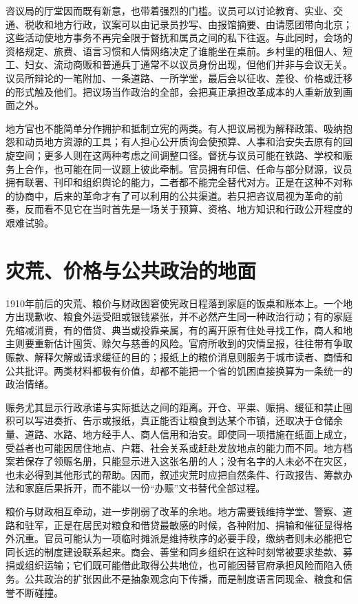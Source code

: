 咨议局的厅堂因而既有新意，也带着强烈的门槛。议员可以讨论教育、实业、交通、税收和地方行政，议案可以由记录员抄写、由报馆摘要、由请愿团带向北京；这些活动使地方事务不再完全限于督抚和属员之间的私下往返。与此同时，会场的资格规定、旅费、语言习惯和人情网络决定了谁能坐在桌前。乡村里的租佃人、短工、妇女、流动商贩和普通兵丁通常不以议员身份出现，但他们并非与会议无关。议员所辩论的一笔附加、一条道路、一所学堂，最后会以征收、差役、价格或迁移的形式触及他们。把议场当作政治的全部，会把真正承担改革成本的人重新放到画面之外。

地方官也不能简单分作拥护和抵制立宪的两类。有人把议局视为解释政策、吸纳抱怨和动员地方资源的工具；有人担心公开质询会使预算、人事和治安失去原有的回旋空间；更多人则在这两种考虑之间调整口径。督抚与议员可能在铁路、学校和赈务上合作，也可能在同一议题上彼此牵制。官员拥有印信、任命与部分财源，议员拥有联署、刊印和组织舆论的能力，二者都不能完全替代对方。正是在这种不对称的协商中，后来的革命才有了可以利用的公共渠道。若只把咨议局视为革命的前奏，反而看不见它在当时首先是一场关于预算、资格、地方知识和行政公开程度的艰难试验。

\section{灾荒、价格与公共政治的地面}

1910年前后的灾荒、粮价与财政困窘使宪政日程落到家庭的饭桌和账本上。一个地方出现歉收、粮食外运受阻或银钱紧张，并不必然产生同一种政治行动；有的家庭先缩减消费，有的借贷、典当或投靠亲属，有的离开原有住处寻找工作，商人和地主则要重新估计囤货、赊欠与慈善的风险。官府所收到的灾情呈报，往往带有争取赈款、解释欠解或请求缓征的目的；报纸上的粮价消息则服务于城市读者、商情和公共批评。两类材料都极有价值，却都不能把一个省的饥困直接换算为一条统一的政治情绪。

赈务尤其显示行政承诺与实际抵达之间的距离。开仓、平粜、赈捐、缓征和禁止囤积可以写进奏折、告示或报纸，真正能否让粮食到达某个市镇，还取决于仓储余量、道路、水路、地方经手人、商人信用和治安。即使同一项措施在纸面上成立，受益者也可能因居住地点、户籍、社会关系或赶赴发放地点的能力而不同。地方档案若保存了领赈名册，只能显示进入这张名册的人；没有名字的人未必不在灾区，也未必得到其他形式的帮助。因而，叙述灾荒时应把自然条件、行政报告、筹款办法和家庭后果拆开，而不能以一份“办赈”文书替代全部过程。

粮价与财政相互牵动，进一步削弱了改革的余地。地方需要钱维持学堂、警察、道路和驻军，正是在居民对粮食和借贷最敏感的时候，各种附加、捐输和催征显得格外沉重。官员可能认为一项临时摊派是维持秩序的必要手段，缴纳者则未必能把它同长远的制度建设联系起来。商会、善堂和同乡组织在这种时刻常被要求垫款、募捐或组织运输；它们既可能借此取得公共地位，也可能因替官府承担风险而陷入债务。公共政治的扩张因此不是抽象观念向下传播，而是制度语言同现金、粮食和信誉不断碰撞。

